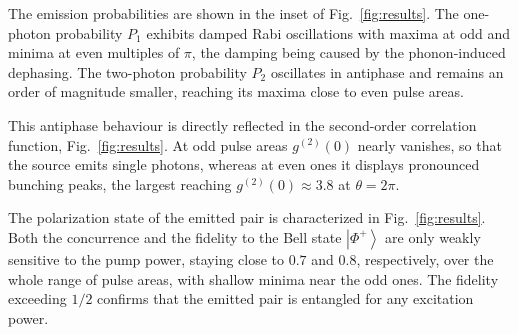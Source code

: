 \documentclass[prb,twocolumn,preprintnumbers,superscriptaddress]{revtex4-2}
\begin{document}
The emission probabilities are shown in the inset of Fig.~\ref{fig:results}.
The one-photon probability $P_1$ exhibits damped Rabi oscillations with maxima at odd
and minima at even multiples of $\pi$, the damping being caused by the
phonon-induced dephasing.
The two-photon probability $P_2$ oscillates in antiphase and remains an order of
magnitude smaller, reaching its maxima close to even pulse areas.

This antiphase behaviour is directly reflected in the second-order correlation
function, Fig.~\ref{fig:results}.
At odd pulse areas $g^{(2)}(0)$ nearly vanishes, so that the source emits single
photons, whereas at even ones it displays pronounced bunching peaks, the largest
reaching $g^{(2)}(0) \approx 3.8$ at $\theta = 2\pi$.

The polarization state of the emitted pair is characterized in
Fig.~\ref{fig:results}.
Both the concurrence and the fidelity to the Bell state
$\left| \Phi^+ \right>$ are only weakly sensitive to the pump power, staying close
to $0.7$ and $0.8$, respectively, over the whole range of pulse areas, with
shallow minima near the odd ones.
The fidelity exceeding $1/2$ confirms that the emitted pair is entangled for any
excitation power.
\end{document}
